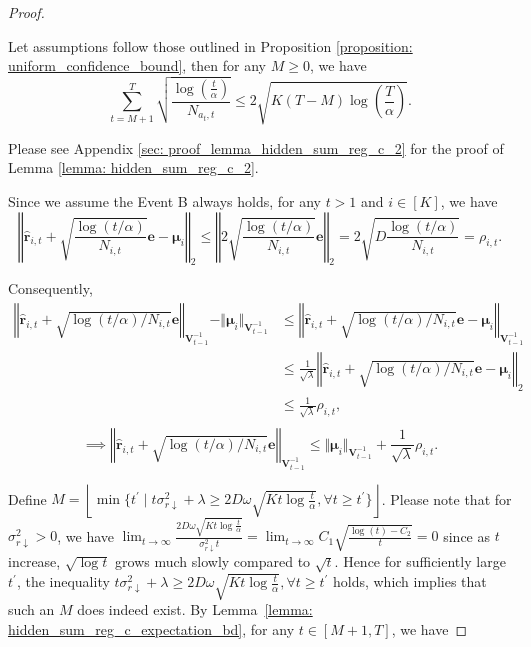 \begin{proof}
\begin{lemma}
\label{lemma: hidden_sum_reg_c_2}
Let assumptions follow those outlined in Proposition \ref{proposition: uniform_confidence_bound}, then for any $M \geq 0$, we have
\[
\sum_{t=M+1}^{T} \sqrt{\frac{ \log \left( \frac{t}{\alpha} \right)}{N_{a_t,t}}}
\leq
2 \sqrt{ K(T-M) \log \left( \frac{T}{\alpha} \right)}.
\]
\end{lemma}
Please see Appendix \ref{sec: proof_lemma_hidden_sum_reg_c_2} for the proof of Lemma \ref{lemma: hidden_sum_reg_c_2}.


Since we assume the Event B always holds, for any $t>1$ and $i \in [K]$, we have  
\[
\left \Vert \boldsymbol{\hat{r}}_{i,t} + \sqrt{\frac{ \log(t/\alpha)}{N_{i,t}}} \boldsymbol{e} - \boldsymbol{\mu}_{i} \right \Vert_2
\leq
\left \Vert 2 \sqrt{\frac{ \log(t/\alpha)}{N_{i,t}}} \boldsymbol{e} \right \Vert_2
=
2 \sqrt{D \frac{ \log(t/\alpha)}{N_{i,t}}} 
=
\rho_{i,t}.
\]

Consequently,
\[
\begin{aligned}
\left \Vert \boldsymbol{\hat{r}}_{i,t} + \sqrt{\log(t/\alpha)/N_{i,t}} \boldsymbol{e} \right \Vert_{\boldsymbol{V}_{t-1}^{-1}}
-
\Vert \boldsymbol{\mu}_{i} \Vert_{\boldsymbol{V}_{t-1}^{-1}}
& \leq
\left \Vert \boldsymbol{\hat{r}}_{i,t} + \sqrt{\log(t/\alpha)/N_{i,t}} \boldsymbol{e} 
-
\boldsymbol{\mu}_{i} \right \Vert_{\boldsymbol{V}_{t-1}^{-1}} \\
& \leq
\frac{1}{\sqrt{\lambda}} 
\left \Vert \boldsymbol{\hat{r}}_{i,t} + \sqrt{\log(t/\alpha)/N_{i,t}} \boldsymbol{e} 
-
\boldsymbol{\mu}_{i} \right \Vert_{2} \\
& \leq
\frac{1}{\sqrt{\lambda}} \rho_{i,t}, \\
\end{aligned}
\]
\begin{equation}
\label{eq:expect_r_gap_hidden}
\implies
\left \Vert \boldsymbol{\hat{r}}_{i,t} + \sqrt{\log(t/\alpha)/N_{i,t}} \boldsymbol{e} \right \Vert_{\boldsymbol{V}_{t-1}^{-1}}
\leq 
\Vert \boldsymbol{\mu}_{i} \Vert_{\boldsymbol{V}_{t-1}^{-1}}
+
\frac{1}{\sqrt{\lambda}} \rho_{i,t}.
\end{equation}


Define $M = \left\lfloor \min \big \{ t^{\prime} \mid t  \sigma^2_{r \downarrow} + \lambda \geq 2D \omega \sqrt{Kt\log \frac{t}{\alpha} }, \forall t \geq t^{\prime} \big \} \right \rfloor$. 
Please note that for $\sigma^2_{r \downarrow} >0$, we have $\lim_{t \rightarrow \infty}\frac{2D \omega \sqrt{Kt \log \frac{t}{\alpha} }}{\sigma^2_{r \downarrow}t} = \lim_{t \rightarrow \infty} C_1 \sqrt{ \frac{ \log (t) - C_2 }{t}} = 0$ since as $t$ increase, $\sqrt{\log t}$ grows much slowly compared to $\sqrt{t}$. Hence for sufficiently large $t^{\prime}$, the inequality $t \sigma^2_{r \downarrow} + \lambda \geq 2D\omega  \sqrt{Kt\log \frac{t}{\alpha} }, \forall t \geq t^{\prime}$ holds, which implies that such an $M$ does indeed exist.
By Lemma~\ref{lemma: hidden_sum_reg_c_expectation_bd}, for any $t \in \left[ M+1, T \right]$, we have 


\end{proof}
